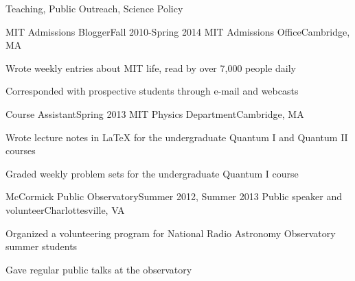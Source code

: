 \documentclass{resume} %
\begin{document}
\begin{rSection}{Teaching, Public Outreach, Science Policy}
\begin{rSubsection}{MIT Admissions Blogger}{Fall 2010-Spring 2014}
  {MIT Admissions Office}{Cambridge, MA}
\item Wrote weekly entries about MIT life, read by over 7,000 people daily
\item Corresponded with prospective students through e-mail and webcasts
\end{rSubsection}

\begin{rSubsection}{Course Assistant}{Spring 2013}
  {MIT Physics Department}{Cambridge, MA}
\item Wrote lecture notes in LaTeX for the undergraduate Quantum I 
  and Quantum II courses
\item Graded weekly problem sets for the undergraduate Quantum I course
\end{rSubsection}

\begin{rSubsection}{McCormick Public Observatory}{Summer 2012, Summer 2013}
  {Public speaker and volunteer}{Charlottesville, VA}
\item Organized a volunteering program for National Radio Astronomy Observatory 
  summer students
\item Gave regular public talks at the observatory
\end{rSubsection}


\end{rSection}

\end{document}
